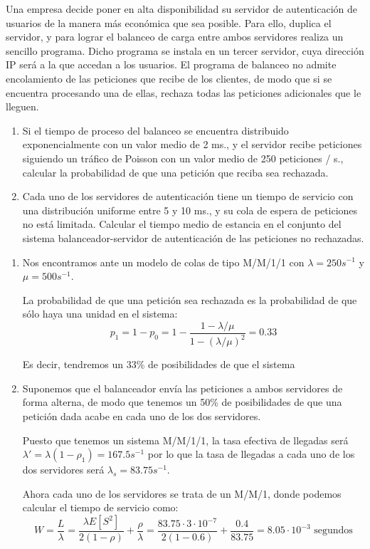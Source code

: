 \begin{problem}[28]
Una empresa decide poner en alta disponibilidad su servidor de autenticación de usuarios de la manera más económica que sea posible. Para ello, duplica el servidor, y para lograr el balanceo de carga entre ambos servidores realiza un sencillo programa. Dicho programa se instala en un tercer servidor, cuya dirección IP será a la que accedan a los usuarios. El programa de balanceo no admite encolamiento de las peticiones que recibe de los clientes, de modo que si se encuentra procesando una de ellas, rechaza todas las peticiones adicionales que le lleguen.
\begin{enumerate}
\item Si el tiempo de proceso del balanceo se encuentra distribuido exponencialmente con un valor medio de 2 ms., y el servidor recibe peticiones siguiendo un tráfico de Poisson con un valor medio de 250 peticiones / s., calcular la probabilidad de que una petición que reciba sea rechazada.
\item Cada uno de los servidores de autenticación tiene un tiempo de servicio con una distribución uniforme entre 5 y 10 ms., y su cola de espera de peticiones no está limitada. Calcular el tiempo medio de estancia en el conjunto del sistema balanceador-servidor de autenticación de las peticiones no rechazadas.
\end{enumerate}
\solution

\yoP

\begin{enumerate}

\item

Nos encontramos ante un modelo de colas de tipo M/M/1/1 con $λ=250s^{-1}$ y $μ=500 s^{-1}$.

La probabilidad de que una petición sea rechazada es la probabilidad de que sólo haya una unidad en el sistema:
\[p_1=1-p_0=1-\frac{1-λ/μ}{1-(λ/μ)^2}=0.33\]

Es decir, tendremos un 33\% de posibilidades de que el sistema
\item

Suponemos que el balanceador envía las peticiones a ambos servidores de forma alterna, de modo que tenemos un 50\% de posibilidades de que una petición dada acabe en cada uno de los dos servidores.

Puesto que tenemos un sistema M/M/1/1, la tasa efectiva de llegadas será $λ'=λ(1-ρ_1)=167.5 s^{-1}$ por lo que la tasa de llegadas a cada uno de los dos servidores será $λ_s=83.75 s^{-1}$.

Ahora cada uno de los servidores se trata de un M/M/1, donde podemos calcular el tiempo de servicio como:
\[W= \frac{L}{λ}=\frac{λE[S^2]}{2(1-ρ)}+\frac{ρ}{λ}=\frac{83.75 \cdot 3 \cdot 10^{-7}}{2(1-0.6)}+\frac{0.4}{83.75}=8.05\cdot 10^{-3} \text{ segundos}\]
\end{enumerate}

\end{problem}
